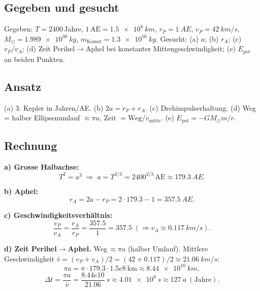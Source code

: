 
\subsection*{Gegeben und gesucht}
Gegeben: $T=2400$\,Jahre, $1\,\mathrm{AE}=\qty{1.5e8}{km}$,
$r_P=\qty{1}{AE}$, $v_P=\qty{42}{km/s}$, $M_\odot=\qty{1.989e30}{kg}$,
$m_\mathrm{Komet}=\qty{1.3e16}{kg}$.
Gesucht: (a) $a$; (b) $r_A$; (c) $v_P/v_A$; (d) Zeit Perihel$\to$Aphel bei
konstanter Mittengeschwindigkeit; (e) $E_\mathrm{pot}$ an beiden Punkten.

\subsection*{Ansatz}
(a) 3. Kepler in Jahren/AE. (b) $2a = r_P+r_A$. (c)
Drehimpulserhaltung. (d) Weg = halber Ellipsenumlauf $\approx \pi a$,
Zeit $=\text{Weg}/v_\mathrm{mitte}$. (e) $E_\mathrm{pot}=-GM_\odot m/r$.

\subsection*{Rechnung}
\textbf{a) Grosse Halbachse:}
\begin{equation}
  T^2 = a^3\;\Rightarrow\;
  a = T^{2/3} = 2400^{2/3}\,\mathrm{AE} \approx \qty{179.3}{AE}.
\end{equation}

\textbf{b) Aphel:}
\begin{equation}
  r_A = 2a-r_P = 2\cdot 179.3 - 1 = \qty{357.5}{AE}.
\end{equation}

\textbf{c) Geschwindigkeitsverhältnis:}
\begin{equation}
  \frac{v_P}{v_A} = \frac{r_A}{r_P}
  = \frac{357.5}{1} = 357.5
  \;(\Rightarrow v_A\approx\qty{0.117}{km/s}).
\end{equation}

\textbf{d) Zeit Perihel$\to$Aphel.} Weg$\,\approx\pi a$ (halber Umlauf).
Mittlere Geschwindigkeit $\bar v=(v_P+v_A)/2=(42+0.117)/2\approx\qty{21.06}{km/s}$:
\begin{equation}
  \pi a = \pi\cdot 179.3\cdot 1.5e8\ \mathrm{km} \approx \qty{8.44e10}{km},
\end{equation}
\begin{equation}
  \Delta t = \frac{\pi a}{\bar v}
  = \frac{8.44e10}{21.06}\ \si{s}
  \approx \qty{4.01e9}{s}
  \approx \qty{127}{a}\ \mathrm{(Jahre)}.
\end{equation}

